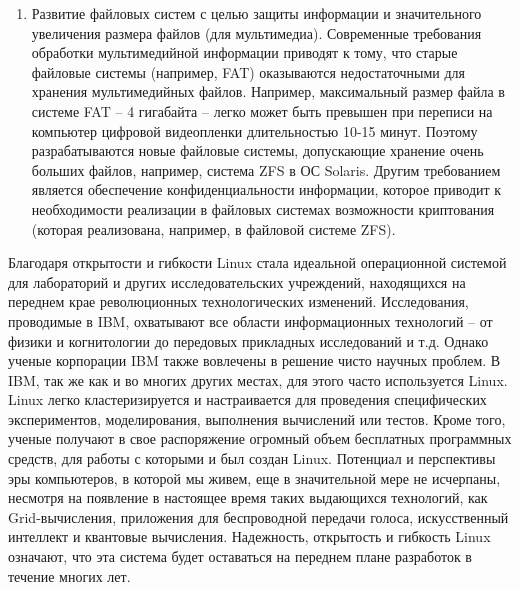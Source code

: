 \begin{enumerate}
	\item Развитие файловых систем с целью защиты информации и значительного увеличения размера файлов (для мультимедиа). Современные требования обработки мультимедийной информации приводят к тому, что старые файловые системы (например, FAT) оказываются недостаточными для хранения мультимедийных файлов. Например, максимальный размер файла в системе FAT – 4 гигабайта – легко может быть превышен при переписи на компьютер цифровой видеопленки длительностью 10-15 минут. Поэтому разрабатываются новые файловые системы, допускающие хранение очень больших файлов, например, система ZFS в ОС Solaris. Другим требованием является обеспечение конфиденциальности информации, которое приводит к необходимости реализации в файловых системах возможности криптования (которая реализована, например, в файловой системе ZFS).
\end{enumerate}

Благодаря открытости и гибкости Linux стала идеальной операционной системой для лабораторий и других исследовательских учреждений, находящихся на переднем крае революционных технологических изменений.  Исследования, проводимые в IBM, охватывают все области информационных технологий – от физики и когнитологии до передовых прикладных исследований и т.д. Однако ученые корпорации IBM также вовлечены в решение чисто научных проблем.  В IBM, так же как и во многих других местах, для этого часто используется Linux.
Linux легко кластеризируется и настраивается для проведения специфических экспериментов, моделирования, выполнения вычислений или тестов. Кроме того, ученые получают в свое распоряжение огромный объем бесплатных программных средств, для работы с которыми и был создан Linux.   Потенциал и перспективы эры компьютеров, в которой мы живем, еще в значительной мере не исчерпаны, несмотря на появление в настоящее время таких выдающихся технологий, как Grid-вычисления, приложения для беспроводной передачи голоса, искусственный интеллект и квантовые вычисления. Надежность, открытость и гибкость Linux означают, что эта система будет оставаться на переднем плане разработок в течение многих лет.
